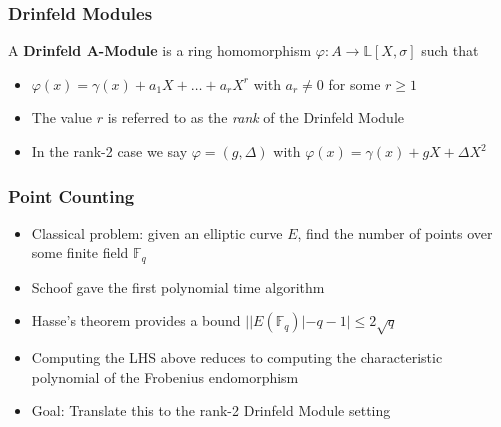 \documentclass{beamer}
\begin{document}
\begin{frame}
\frametitle{Drinfeld Modules}

\begin{definition}
A \textbf{Drinfeld A-Module} is a ring homomorphism $\varphi: A \to \mathbb{L}[X,\sigma]$ such that 

\begin{itemize}
    \item $\varphi(x) = \gamma(x) + a_1X + \ldots + a_rX^r$ with $a_r \neq 0$ for some $r \geq 1$
\end{itemize}
\end{definition}

\begin{itemize}
    \item The value $r$ is referred to as the \textit{rank} of the Drinfeld Module
        \item In the rank-2 case we say $\varphi = (g, \Delta)$ with $\varphi(x) = \gamma(x) + gX + \Delta X^2$
\end{itemize}

\end{frame}






\begin{frame}
\frametitle{Point Counting}

\begin{itemize}
\item Classical problem: given an elliptic curve $E$, find the number of points over some finite field $\mathbb{F}_q$ 
\item Schoof gave the first polynomial time algorithm
\item Hasse's theorem provides a bound $ | |E(\mathbb{F}_q)| - q - 1  | \leq 2 \sqrt{q} $

\item Computing the LHS above reduces to computing the characteristic polynomial of the Frobenius endomorphism

\item Goal: Translate this to the rank-2 Drinfeld Module setting
\end{itemize}

\end{frame}


\end{document}
